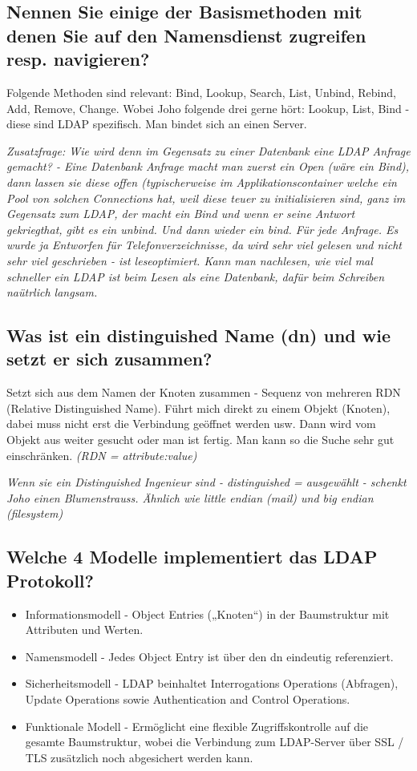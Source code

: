 \subsection{Nennen Sie einige der Basismethoden mit denen Sie auf den Namensdienst zugreifen resp. navigieren?}
Folgende Methoden sind relevant: Bind, Lookup, Search, List, Unbind, Rebind, Add, Remove, Change. Wobei Joho folgende drei gerne hört: Lookup, List, Bind - diese sind LDAP spezifisch. Man bindet sich an einen Server.

\emph{Zusatzfrage: Wie wird denn im Gegensatz zu einer Datenbank eine LDAP Anfrage gemacht? - Eine Datenbank Anfrage macht man zuerst ein Open (wäre ein Bind), dann lassen sie diese offen (typischerweise im Applikationscontainer welche ein Pool von solchen Connections hat, weil diese teuer zu initialisieren sind, ganz im Gegensatz zum LDAP, der macht ein Bind und wenn er seine Antwort gekriegthat, gibt es ein unbind. Und dann wieder ein bind. Für jede Anfrage. Es wurde ja Entworfen für Telefonverzeichnisse, da wird sehr viel gelesen und nicht sehr viel geschrieben - ist leseoptimiert. Kann man nachlesen, wie viel mal schneller ein LDAP ist beim Lesen als eine Datenbank, dafür beim Schreiben naütrlich langsam.}

\subsection{Was ist ein distinguished Name (dn) und wie setzt er sich zusammen?}
Setzt sich aus dem Namen der Knoten zusammen - Sequenz von mehreren RDN (Relative Distinguished Name). Führt mich direkt zu einem Objekt (Knoten), dabei muss nicht erst die Verbindung geöffnet werden usw. Dann wird vom Objekt aus weiter gesucht oder man ist fertig. Man kann so die Suche sehr gut einschränken. \emph{(RDN = attribute:value)}

\emph{Wenn sie ein Distinguished Ingenieur sind - distinguished = ausgewählt - schenkt Joho einen Blumenstrauss. Ähnlich wie little endian (mail) und big endian (filesystem)}

\subsection{Welche 4 Modelle implementiert das LDAP Protokoll?}
\begin{itemize}
	\item Informationsmodell - Object Entries („Knoten“) in der Baumstruktur mit Attributen und Werten.
	\item Namensmodell - Jedes Object Entry ist über den dn eindeutig referenziert.
	\item Sicherheitsmodell - LDAP beinhaltet Interrogations Operations (Abfragen), Update Operations sowie Authentication and Control Operations.
	\item Funktionale Modell - Ermöglicht eine flexible Zugriffskontrolle auf die gesamte Baumstruktur, wobei die	Verbindung zum LDAP-Server über SSL / TLS zusätzlich noch abgesichert werden kann.
\end{itemize}

